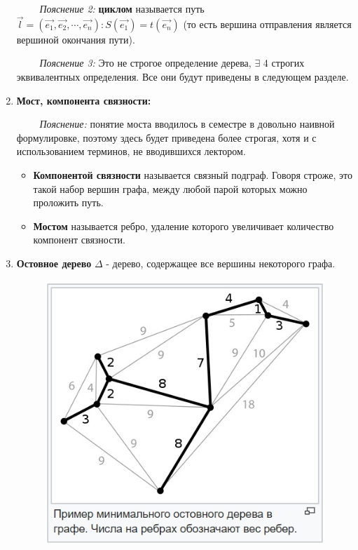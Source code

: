 \documentclass[a4paper,12pt]{article}
\begin{document}
\begin{enumerate}
            $\qquad$ \textit{Пояснение 2:} \textbf{циклом} называется путь $\Vec{l} = (\Vec{e_1}, \Vec{e_2}, \cdots, \Vec{e_n}): S(\Vec{e_1}) = t(\Vec{e_n})$ (то есть вершина отправления является вершиной окончания пути).
            
            $\qquad$ \textit{Пояснение 3:} Это не строгое определение дерева, $\exists$ 4 строгих эквивалентных определения. Все они будут приведены в следующем разделе.
            \item \textbf{Мост, компонента связности:}
                
            $\qquad$ \textit{Пояснение:} понятие моста вводилось в семестре в довольно наивной формулировке, поэтому здесь будет приведена более строгая, хотя и с использованием терминов, не вводившихся лектором.
                \begin{itemize}
                    \item \textbf{Компонентой связности} называется связный подграф. Говоря строже, это такой набор вершин графа, между любой парой которых можно проложить путь.
                    \item \textbf{Мостом} называется ребро, удаление которого увеличивает количество компонент связности.
                \end{itemize}
            
            \item \textbf{Остовное дерево} $\Delta$  - дерево, содержащее все вершины некоторого графа.
            \begin{figure}[ht]

                    \centering
                    
                    \includegraphics[scale=0.7]{ex3.jpg}
                    

\end{figure}
\end{enumerate}
\end{document}
